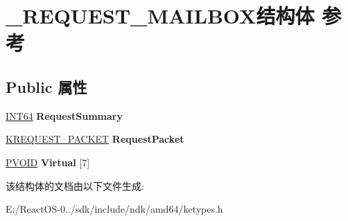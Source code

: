 \hypertarget{struct___r_e_q_u_e_s_t___m_a_i_l_b_o_x}{}\section{\+\_\+\+R\+E\+Q\+U\+E\+S\+T\+\_\+\+M\+A\+I\+L\+B\+O\+X结构体 参考}
\label{struct___r_e_q_u_e_s_t___m_a_i_l_b_o_x}
\subsection*{Public 属性}
\begin{DoxyCompactItemize}
\item 
\mbox{\label{struct___r_e_q_u_e_s_t___m_a_i_l_b_o_x_a07f465a00be18ed997b79a44b6df3b66}} 
\hyperlink{_processor_bind_8h_af16992cf571ce4103a92355761cc471e}{I\+N\+T64} {\bfseries Request\+Summary}
\item 
\mbox{\label{struct___r_e_q_u_e_s_t___m_a_i_l_b_o_x_a40699ee1735322a7d01ce6857da2e86d}} 
\hyperlink{struct___k_r_e_q_u_e_s_t___p_a_c_k_e_t}{K\+R\+E\+Q\+U\+E\+S\+T\+\_\+\+P\+A\+C\+K\+ET} {\bfseries Request\+Packet}
\item 
\mbox{\label{struct___r_e_q_u_e_s_t___m_a_i_l_b_o_x_aa9c78b830b68a54bd62bab28c34b874d}} 
\hyperlink{interfacevoid}{P\+V\+O\+ID} {\bfseries Virtual} \mbox{[}7\mbox{]}
\end{DoxyCompactItemize}


该结构体的文档由以下文件生成\+:\begin{DoxyCompactItemize}
\item 
E\+:/\+React\+O\+S-\/0../sdk/include/ndk/amd64/ketypes.\+h\end{DoxyCompactItemize}
